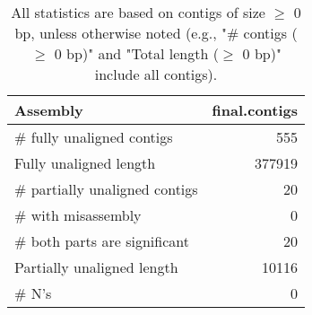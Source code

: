 \documentclass[12pt,a4paper]{article}
\begin{document}
\begin{table}[ht]
\begin{center}
\caption{All statistics are based on contigs of size $\geq$ 0 bp, unless otherwise noted (e.g., "\# contigs ($\geq$ 0 bp)" and "Total length ($\geq$ 0 bp)" include all contigs).}
\begin{tabular}{|l*{1}{|r}|}
\hline
Assembly & final.contigs \\ \hline
\# fully unaligned contigs & 555 \\ \hline
Fully unaligned length & 377919 \\ \hline
\# partially unaligned contigs & 20 \\ \hline
\hspace{5mm}\# with misassembly & 0 \\ \hline
\hspace{5mm}\# both parts are significant & 20 \\ \hline
Partially unaligned length & 10116 \\ \hline
\# N's & 0 \\ \hline
\end{tabular}
\end{center}
\end{table}
\end{document}

